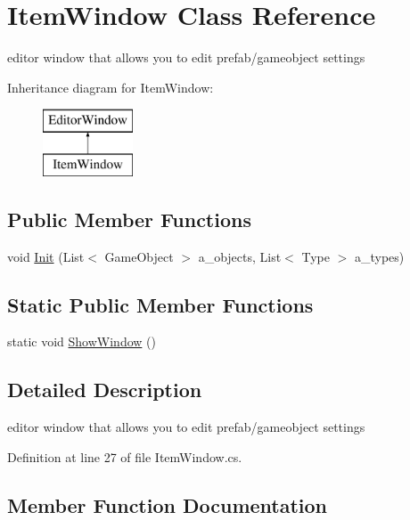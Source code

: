 \hypertarget{class_item_window}{}\section{Item\+Window Class Reference}
\label{class_item_window}


editor window that allows you to edit prefab/gameobject settings  


Inheritance diagram for Item\+Window\+:\begin{figure}[H]
\begin{center}
\leavevmode
\includegraphics[height=2.000000cm]{class_item_window}
\end{center}
\end{figure}
\subsection*{Public Member Functions}
\begin{DoxyCompactItemize}
\item 
void \mbox{\hyperlink{class_item_window_a16ee15ddc3f84cd9070ca2d1bdd34185}{Init}} (List$<$ Game\+Object $>$ a\+\_\+objects, List$<$ Type $>$ a\+\_\+types)
\end{DoxyCompactItemize}
\subsection*{Static Public Member Functions}
\begin{DoxyCompactItemize}
\item 
static void \mbox{\hyperlink{class_item_window_ae4a63494162672f222924dbd779ac992}{Show\+Window}} ()
\end{DoxyCompactItemize}


\subsection{Detailed Description}
editor window that allows you to edit prefab/gameobject settings 



Definition at line 27 of file Item\+Window.\+cs.



\subsection{Member Function Documentation}
\mbox{\label{class_item_window_a16ee15ddc3f84cd9070ca2d1bdd34185}} 
